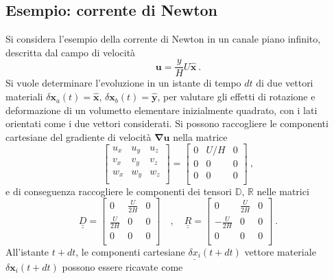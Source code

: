 \documentclass[11pt,fleqn]{article}
\newcommand{\ul}[1]{\underline{#1}}
\newcommand{\uul}[1]{\ul{\ul{#1}}}
\begin{document}
\subsection{Esempio: corrente di Newton}
Si considera l'esempio della corrente di Newton in un canale piano infinito, descritta dal campo di velocità 
\begin{equation}
  \bm{u} = \frac{y}{H}U \bm{\hat{x}} \ .
\end{equation}
Si vuole determinare l'evoluzione in un istante di tempo $dt$ di due vettori materiali $\delta \bm{x}_a(t) = \bm{\hat{x}}$, $\delta \bm{x}_b(t) = \bm{\hat{y}}$, per valutare gli effetti di rotazione e deformazione di un volumetto elementare inizialmente quadrato, con i lati orientati come i due vettori considerati.
Si possono raccogliere le componenti cartesiane del gradiente di velocità $\bm{\nabla} \bm{u}$ nella matrice
\begin{equation}
 \left[
 \begin{array}{ccc} 
   u_x & u_y & u_z \\
   v_x & v_y & v_z \\
   w_x & w_y & w_z \\
 \end{array} \right] = 
 \left[
 \begin{array}{ccc} 
   0 & U/H & 0 \\
   0 &  0  & 0 \\
   0 &  0  & 0 \\
 \end{array} \right] \ ,
\end{equation}
e di conseguenza raccogliere le componenti dei tensori $\mathbb{D}$, $\mathbb{R}$ nelle matrici
\begin{equation}
 \uul{D} = 
 \left[
 \begin{array}{ccc} 
   0 & \frac{U}{2H} & 0 \\
   \frac{U}{2H} & 0 & 0 \\
   0 &  0  & 0 \\
 \end{array} \right] \quad , \quad
 \uul{R} = 
 \left[
 \begin{array}{ccc} 
   0 & \frac{U}{2H} & 0 \\
  -\frac{U}{2H} & 0 & 0 \\
   0 &  0  & 0 \\
 \end{array} \right] \ .
\end{equation}
All'istante $t+dt$, le componenti cartesiane $\ul{\delta x_i}(t+dt)$ vettore materiale $\delta \bm{x}_i(t+dt)$ possono essere ricavate come
\end{document}
